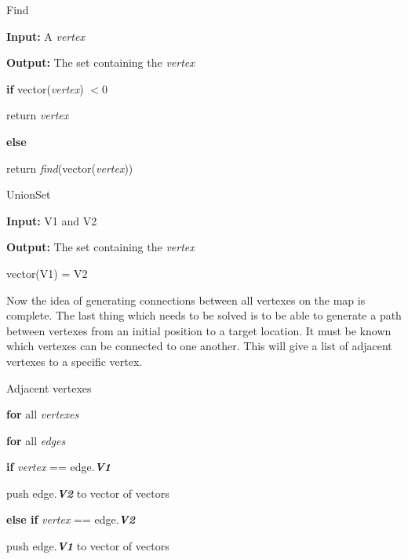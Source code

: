 \documentclass[../Head/Main.tex]{subfiles}
\begin{document}
\begin{Pseudo}{Find}{}

 \textbf{Input:} A \textit{vertex}
 
 \textbf{Output:} The set containing the \textit{vertex}
 
	\begin{Indentation}
	\item
	
	\item \textbf{if} vector(\textit{vertex}) $ < 0$
 	  \item return \textit{vertex} 
 	\item \textbf{else} 
 	  \item return \textit{find}(vector(\textit{vertex}))
	
	\end{Indentation}

\end{Pseudo} 



\begin{Pseudo}{UnionSet}{}

 \textbf{Input:} V1 and V2
 
 \textbf{Output:} The set containing the \textit{vertex}
 
	\begin{Indentation}
	\item
	
	\item vector(V1) = V2
	
	\end{Indentation}

\end{Pseudo} 

Now the idea of generating connections between all vertexes on the map is complete. The last thing which needs to be solved is to be able to generate a path between vertexes from an initial position to a target location. It must be known which vertexes can be connected to one another. This will give a list of adjacent vertexes to a specific vertex. 
   
\begin{Pseudo}{Adjacent vertexes}{}

 
 	\textbf{for} all \textit{vertexes}
	\begin{Indentation}
		\item 
	\begin{Indentation}
	\item \textbf{for} all \textit{edges}
	\item \textbf{if} \textit{vertex} == edge.\textbf{\textit{V1}}
		\item push edge.\textbf{\textit{V2}} to vector of vectors
	\item \textbf{else if} \textit{vertex} == edge.\textbf{\textit{V2}}
		\item push edge.\textbf{\textit{V1}} to vector of vectors

	\end{Indentation}
	
	\end{Indentation}

\end{Pseudo} 
\end{document}
